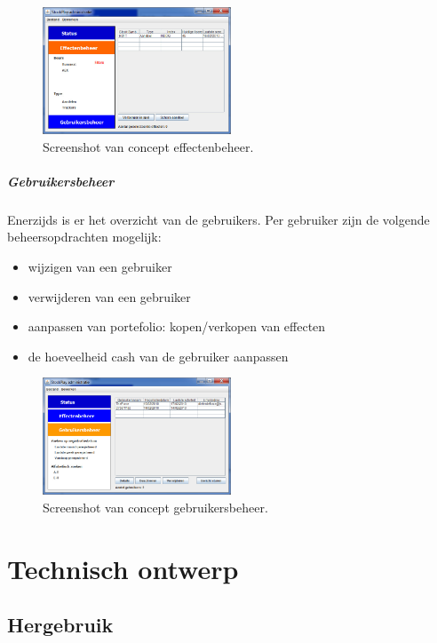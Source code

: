 \begin{figure}[h!]
	\centering
		\includegraphics[width=0.5\textwidth]{images/ontwerp/screenshot_app_effecten}
	\caption{Screenshot van concept effectenbeheer.}
\end{figure}

\paragraph{Gebruikersbeheer}Enerzijds is er het overzicht van de gebruikers. Per gebruiker zijn de volgende beheersopdrachten mogelijk: 
\begin{itemize}
	\item{wijzigen van een gebruiker}
	\item{verwijderen van een gebruiker}
	\item{aanpassen van portefolio: kopen/verkopen van effecten}
	\item{de hoeveelheid cash van de gebruiker aanpassen}
\end{itemize}

\begin{figure}[h!]
	\centering
		\includegraphics[width=0.5\textwidth]{images/ontwerp/screenshot_app_gebruikers}
	\caption{Screenshot van concept gebruikersbeheer.}
\end{figure}


%
%

\chapter{Technisch ontwerp}

\section{Hergebruik}

